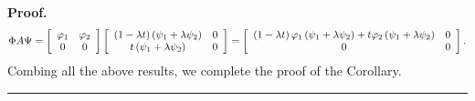 \documentclass[10pt,a4paper]{amsart}
\newenvironment{proof}[1][Proof]{\noindent\textbf{#1.} }{\ \rule{0.5em}{0.5em}}
\begin{document}
\begin{proof}
\begin{align}
\Phi A\Psi=\left[
\begin{array}
[c]{cc}%
\varphi_{1} & \varphi_{2}\\
0 & 0
\end{array}
\right]  \left[
\begin{array}
[c]{cc}%
\left(  1-\lambda t\right)  \left(  \psi_{1}+\lambda\psi_{2}\right)  & 0\\
t\left(  \psi_{1}+\lambda\psi_{2}\right)  & 0
\end{array}
\right]  =\left[
\begin{array}
[c]{cc}%
\left(  1-\lambda t\right)  \varphi_{1}\left(  \psi_{1}+\lambda\psi
_{2}\right)  +t\varphi_{2}\left(  \psi_{1}+\lambda\psi_{2}\right)  & 0\\
0 & 0
\end{array}
\right]  .\nonumber
\end{align}
Combing all the above results, we complete the proof of the Corollary.
\end{proof}
\end{document}
